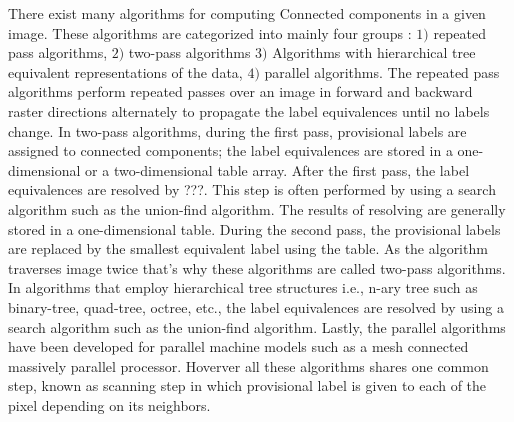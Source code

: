 There exist many algorithms for computing Connected components in a given image. These algorithms are categorized into
mainly four groups %
\cite{Suzuki2003_Linear}
: $1)$ repeated pass algorithms, $2)$ two-pass algorithms $3)$ Algorithms with hierarchical tree equivalent representations 
of the data, $4)$ parallel algorithms.
The repeated pass algorithms perform repeated passes over an image in forward and backward raster directions alternately
to propagate the label equivalences until no labels change.
In two-pass algorithms, during the first pass, provisional labels are assigned to connected components;
the label equivalences are stored in a one-dimensional or a two-dimensional table array. After the first pass, the label 
equivalences are resolved by ???. This step is often performed by using a search algorithm such as the union-find algorithm.
The results of resolving are generally stored in a one-dimensional table. During the second pass, the provisional labels are 
replaced by the smallest equivalent label using the table. As the algorithm traverses image twice that's why these algorithms 
are called two-pass algorithms.
In algorithms that employ hierarchical tree structures i.e., n-ary tree such as binary-tree, quad-tree, octree, etc., the
label equivalences are resolved by using a search algorithm such as the union-find algorithm.
Lastly, the parallel algorithms have been developed for parallel machine models such as a mesh connected massively parallel processor.
Hoverver all these algorithms shares one common step, known as scanning step in which provisional label is given to each of the
pixel depending on its neighbors.

